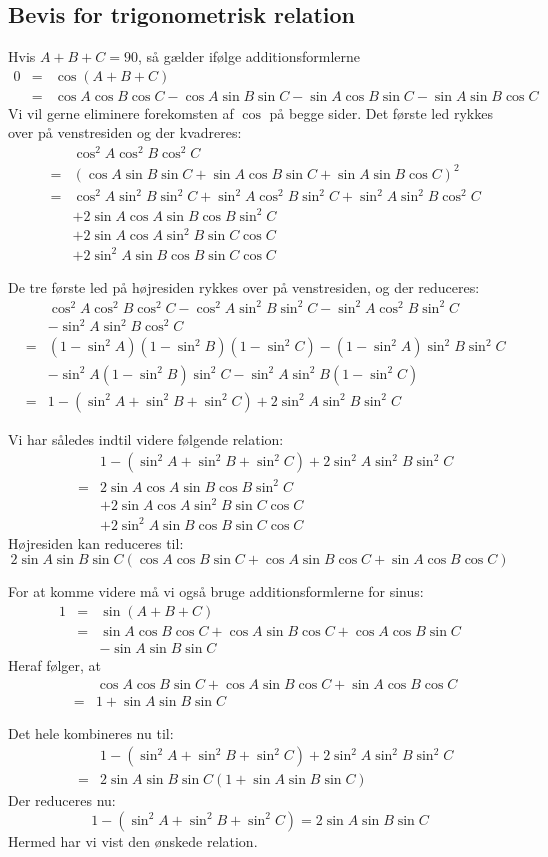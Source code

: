 \documentclass[12pt,oneside,a4paper]{article}
\newcommand{\bas}{\begin{eqnarray*}}
\newcommand{\eas}{\end{eqnarray*}}
\begin{document}
\subsection*{Bevis for trigonometrisk relation}
Hvis $A+B+C=90$, så gælder ifølge additionsformlerne
\bas
0 &=& \cos(A+B+C) \\
  &=& \cos A \cos B \cos C - \cos A \sin B \sin C - \sin A \cos B \sin C - \sin A \sin B \cos C
\eas
Vi vil gerne eliminere forekomsten af $\cos{}$ på begge sider.
Det første led rykkes over på venstresiden og der kvadreres:
\bas
&& \cos^2 A \cos^2 B \cos^2 C \\
&=& \left(\cos A \sin B \sin C + \sin A \cos B \sin C + \sin A \sin B \cos C\right)^2 \\
&=& \cos^2 A \sin^2 B \sin^2 C + \sin^2 A \cos^2 B \sin^2 C + \sin^2 A \sin^2 B \cos^2 C \\
&& + 2\sin A\cos A \sin B \cos B \sin^2 C \\
&& + 2\sin A\cos A \sin^2 B \sin C \cos C \\
&& + 2\sin^2 A \sin B \cos B \sin C \cos C 
\eas

De tre første led på højresiden rykkes over på venstresiden, og der reduceres:
\bas
&& \cos^2 A \cos^2 B \cos^2 C - 
\cos^2 A \sin^2 B \sin^2 C - \sin^2 A \cos^2 B \sin^2 C \\
&& - \sin^2 A \sin^2 B \cos^2 C \\
&=& (1-\sin^2 A) (1-\sin^2 B) (1-\sin^2 C) - (1-\sin^2 A) \sin^2 B \sin^2 C \\
&& - \sin^2 A (1-\sin^2 B) \sin^2 C - \sin^2 A \sin^2 B (1-\sin^2 C) \\
&=& 1 - (\sin^2 A + \sin^2 B + \sin^2 C) + 2 \sin^2 A \sin^2 B \sin^2 C 
\eas

Vi har således indtil videre følgende relation:
\bas
&&1 - (\sin^2 A + \sin^2 B + \sin^2 C) + 2 \sin^2 A \sin^2 B \sin^2 C  \\
&=& 2\sin A\cos A \sin B \cos B \sin^2 C \\
&& + 2\sin A\cos A \sin^2 B \sin C \cos C \\
&& + 2\sin^2 A \sin B \cos B \sin C \cos C 
\eas
Højresiden kan reduceres til:
$$
2\sin A\sin B \sin C \left (\cos A \cos B \sin C + \cos A \sin B \cos C + \sin A \cos B \cos C\right)
$$

For at komme videre må vi også bruge additionsformlerne for sinus:
\bas
1 &=& \sin(A+B+C) \\
  &=& \sin A \cos B \cos C + \cos A \sin B \cos C + \cos A \cos B \sin C \\
  &&- \sin A \sin B \sin C
\eas
Heraf følger, at
\bas
&& \cos A \cos B \sin C + \cos A \sin B \cos C + \sin A \cos B \cos C \\
&=& 1 + \sin A \sin B \sin C
\eas

Det hele kombineres nu til:
\bas
&&1 - (\sin^2 A + \sin^2 B + \sin^2 C) + 2 \sin^2 A \sin^2 B \sin^2 C  \\
&=& 2\sin A\sin B \sin C \left ( 1 + \sin A \sin B \sin C \right) 
\eas
Der reduceres nu:
$$
1 - (\sin^2 A + \sin^2 B + \sin^2 C) = 2\sin A\sin B \sin C 
$$
Hermed har vi vist den ønskede relation.
\end{document}
